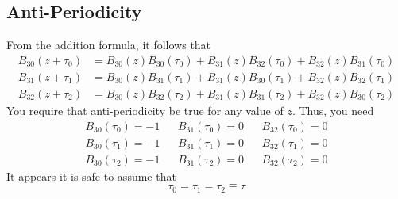 \subsection{Anti-Periodicity}
From the addition formula, it follows that
\begin{align}
    B_{30}\left(z + \tau_{0}\right) &= B_{30}(z) B_{30}(\tau_{0}) + B_{31}(z) B_{32}(\tau_{0}) + B_{32}(z) B_{31}(\tau_{0}) \\
    B_{31}\left(z + \tau_{1}\right) &= B_{30}(z) B_{31}(\tau_{1}) + B_{31}(z) B_{30}(\tau_{1}) + B_{32}(z) B_{32}(\tau_{1}) \\
    B_{32}\left(z + \tau_{2}\right) &= B_{30}(z) B_{32}(\tau_{2}) + B_{31}(z) B_{31}(\tau_{2}) + B_{32}(z) B_{30}(\tau_{2})
\end{align}
You require that anti-periodicity be true for any value of $z$. Thus, you need
\begin{align}
    B_{30}(\tau_{0}) = -1 && B_{31}(\tau_{0}) = 0 && B_{32}(\tau_{0}) = 0 \\
    B_{30}(\tau_{1}) = -1 && B_{31}(\tau_{1}) = 0 && B_{32}(\tau_{1}) = 0 \\
    B_{30}(\tau_{2}) = -1 && B_{31}(\tau_{2}) = 0 && B_{32}(\tau_{2}) = 0
\end{align}
It appears it is safe to assume that
\begin{equation}
    \tau_{0} = \tau_{1} = \tau_{2} \equiv \tau
\end{equation}
